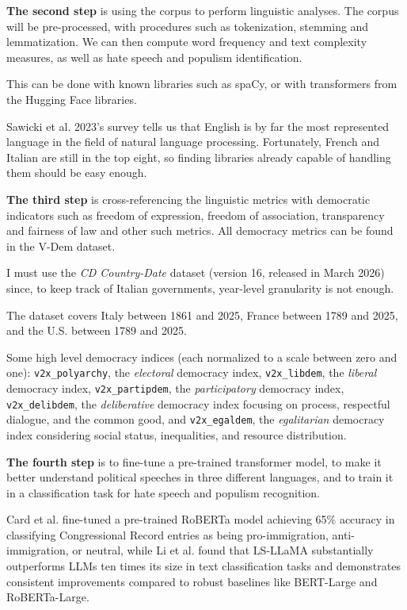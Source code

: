 \textbf{The second step} is using the corpus to perform linguistic analyses. The corpus will be pre-processed, with procedures such as tokenization, stemming and lemmatization. We can then compute word frequency and text complexity measures, as well as hate speech and populism identification.

This can be done with known libraries such as spaCy, or with transformers from the Hugging Face libraries. 

Sawicki et al. 2023's survey \cite{sawicki_state_2023} tells us that English is by far the most represented language in the field of natural language processing. Fortunately, French and Italian are still in the top eight, so finding libraries already capable of handling them should be easy enough.

\textbf{The third step} is cross-referencing the linguistic metrics with democratic indicators such as freedom of expression, freedom of association, transparency and fairness of law and other such metrics. All democracy metrics can be found in the V-Dem dataset.

I must use the \textit{CD Country-Date} dataset (version 16, released in March 2026) since, to keep track of Italian governments, year-level granularity is not enough. 

The dataset covers Italy between 1861 and 2025, France between 1789 and 2025, and the U.S. between 1789 and 2025.

Some high level democracy indices (each normalized to a scale between zero and one): \texttt{v2x\_polyarchy}, the \textit{electoral} democracy index, \texttt{v2x\_libdem}, the \textit{liberal} democracy index, \texttt{v2x\_partipdem}, the \textit{participatory} democracy index, \texttt{v2x\_delibdem}, the \textit{deliberative} democracy index focusing on process, respectful dialogue, and the common good, and \texttt{v2x\_egaldem}, the \textit{egalitarian} democracy index considering social status, inequalities, and resource distribution.

\textbf{The fourth step} is to fine-tune a pre-trained transformer model, to make it better understand political speeches in three different languages, and to train it in a classification task for hate speech and populism recognition.

Card et al. \cite{card_computational_2022} fine-tuned a pre-trained RoBERTa model achieving 65\% accuracy in classifying Congressional Record entries as being pro-immigration, anti-immigration, or neutral, while Li et al. \cite{li_label_2023} found that LS-LLaMA substantially outperforms LLMs ten times its size in text classification tasks and demonstrates consistent improvements compared to robust baselines like BERT-Large and RoBERTa-Large.
